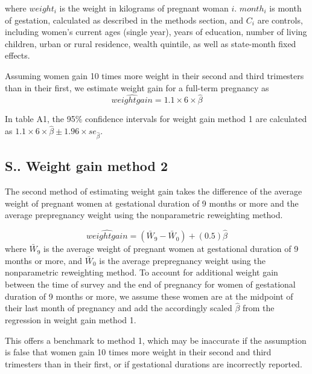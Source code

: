 \documentclass[12pt]{article}
\begin{document}
where $weight_i$ is the weight in kilograms of pregnant woman $i$. $month_i$ is month of gestation, calculated as described in the methods section, and $C_i$ are controls, including women's current ages (single year), years of education, number of living children, urban or rural residence, wealth quintile, as well as state-month fixed effects.

Assuming women gain 10 times more weight in their second and third trimesters than in their first, we estimate weight gain for a full-term pregnancy as 
\begin{equation}
    \hat{weight gain} = 1.1\times6\times\hat{\beta}
\end{equation}

In table A1, the 95\% confidence intervals for weight gain method 1 are calculated as $1.1\times6\times\hat{\beta} \pm 1.96\times se_{\hat{\beta}}$.

\subsection{S.. Weight gain method 2} \label{sec:weightgainm2}


The second method of estimating weight gain takes the difference of the average weight of pregnant women at gestational duration of 9 months or more and the average prepregnancy weight using the nonparametric reweighting method. 


\begin{equation}
    \hat{weight gain} = (\bar{W}_9-\bar{W}_0)+(0.5)\hat{\beta}
\end{equation}
where $\bar{W}_9$ is the average weight of pregnant women at gestational duration of 9 months or more, and $\bar{W}_0$ is the average prepregnancy weight using the nonparametric reweighting method. To account for additional weight gain between the time of survey and the end of pregnancy for women of gestational duration of 9 months or more, we assume these women are at the midpoint of their last month of pregnancy and add the accordingly scaled $\hat{\beta}$ from the regression in weight gain method 1.

This offers a benchmark to method 1, which may be inaccurate if the assumption is false that women gain 10 times more weight in their second and third trimesters than in their first, or if gestational durations are incorrectly reported.
\end{document}
